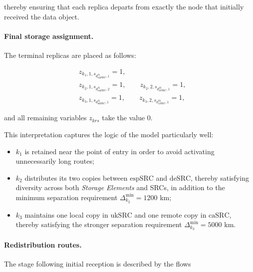 \documentclass[a4paper,fleqn]{cas-dc}
\begin{document}
thereby ensuring that each replica departs from exactly the node that initially received the data object.

\paragraph{Final storage assignment.} 

The terminal replicas are placed as follows:

\begin{align*}
&z_{k_1,1,s_{d_{\mathrm{espSRC}}^{T1},1}}=1,\\
&z_{k_2,1,s_{d_{\mathrm{espSRC}}^{T1},2}}=1,
\qquad
z_{k_2,2,s_{d_{\mathrm{deSRC}}^{T2},1}}=1,\\
&z_{k_3,1,s_{d_{\mathrm{ukSRC}}^{T1},1}}=1,
\qquad
z_{k_3,2,s_{d_{\mathrm{caSRC}}^{T2},1}}=1,
\end{align*}

and all remaining variables \(z_{krs}\) take the value \(0\).

This interpretation captures the logic of the model particularly well:

\begin{itemize} 
\item \(k_1\) is retained near the point of entry in order to avoid activating unnecessarily long routes; \item \(k_2\) distributes its two copies between \(\mathrm{espSRC}\) and \(\mathrm{deSRC}\), thereby satisfying diversity across both \emph{Storage Elements} and SRCs, in addition to the minimum separation requirement \(\Delta_{k_2}^{\min}=1200\) km; 
\item \(k_3\) maintains one local copy in \(\mathrm{ukSRC}\) and one remote copy in \(\mathrm{caSRC}\), thereby satisfying the stronger separation requirement \(\Delta_{k_3}^{\min}=5000\) km.
\end{itemize}


\paragraph{Redistribution routes.} 

The stage following initial reception is described by the flows
\end{document}
